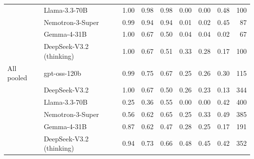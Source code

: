 \begin{tabular}{llrrrrrrr}
 & Llama-3.3-70B & 1.00 & 0.98 & 0.98 & 0.00 & 0.00 & 0.48 & 100 \\
 & Nemotron-3-Super & 0.99 & 0.94 & 0.94 & 0.01 & 0.02 & 0.45 & 87 \\
 & Gemma-4-31B & 1.00 & 0.67 & 0.50 & 0.04 & 0.04 & 0.02 & 67 \\
 & DeepSeek-V3.2 (thinking) & 1.00 & 0.67 & 0.51 & 0.33 & 0.28 & 0.17 & 100 \\
\midrule
All pooled & gpt-oss-120b & 0.99 & 0.75 & 0.67 & 0.25 & 0.26 & 0.30 & 115 \\
 & DeepSeek-V3.2 & 1.00 & 0.67 & 0.50 & 0.26 & 0.23 & 0.13 & 344 \\
 & Llama-3.3-70B & 0.25 & 0.36 & 0.55 & 0.00 & 0.00 & 0.42 & 400 \\
 & Nemotron-3-Super & 0.56 & 0.62 & 0.65 & 0.25 & 0.33 & 0.49 & 385 \\
 & Gemma-4-31B & 0.87 & 0.62 & 0.47 & 0.28 & 0.25 & 0.17 & 191 \\
 & DeepSeek-V3.2 (thinking) & 0.94 & 0.73 & 0.66 & 0.48 & 0.45 & 0.42 & 352 \\
\bottomrule
\end{tabular}
